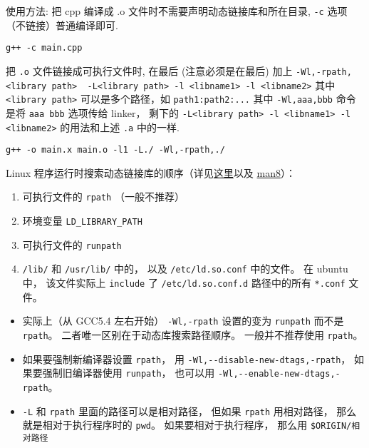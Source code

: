 使用方法:
把 cpp 编译成 .o 文件时不需要声明动态链接库和所在目录, \verb`-c` 选项（不链接）普通编译即可.
\begin{lstlisting}[language=none]
g++ -c main.cpp
\end{lstlisting}
把 \verb|.o| 文件链接成可执行文件时, 在最后 (注意必须是在最后) 加上
\verb`-Wl,-rpath,<library path>  -L<library path> -l <libname1> -l <libname2>` 其中 \verb|<library path>| 可以是多个路径，如 \verb|path1:path2:...|
其中 \verb`-Wl,aaa,bbb` 命令是将 \verb`aaa bbb` 选项传给 linker， 剩下的 \verb`-L<library path> -l <libname1> -l <libname2>` 的用法和上述 \verb|.a| 中的一样.

\begin{lstlisting}[language=none]
g++ -o main.x main.o -l1 -L./ -Wl,-rpath,./
\end{lstlisting}

Linux 程序运行时搜索动态链接库的顺序（详见\href{https://unix.stackexchange.com/questions/22926/where-do-executables-look-for-shared-objects-at-runtime}{这里}以及 \href{https://man7.org/linux/man-pages/man8/ld.so.8.html}{man8}）：
\begin{enumerate}
\item 可执行文件的 \verb|rpath| （一般不推荐）
\item 环境变量 \verb|LD_LIBRARY_PATH|
\item 可执行文件的 \verb|runpath|
\item \verb|/lib/| 和 \verb|/usr/lib/| 中的， 以及 \verb|/etc/ld.so.conf| 中的文件。 在 ubuntu 中， 该文件实际上 \verb|include| 了 \verb|/etc/ld.so.conf.d| 路径中的所有 \verb|*.conf| 文件。
\end{enumerate}

\begin{itemize}
\item 实际上（从 GCC5.4 左右开始） \verb|-Wl,-rpath| 设置的变为 \verb|runpath| 而不是 \verb|rpath|。 二者唯一区别在于动态库搜索路径顺序。 一般并不推荐使用 \verb|rpath|。
\item 如果要强制新编译器设置 \verb|rpath|， 用 \verb|-Wl,--disable-new-dtags,-rpath|， 如果要强制旧编译器使用 \verb|runpath|， 也可以用 \verb|-Wl,--enable-new-dtags,-rpath|。
\item \verb|-L| 和 \verb|rpath| 里面的路径可以是相对路径， 但如果 \verb|rpath| 用相对路径， 那么就是相对于执行程序时的 \verb|pwd|。 如果要相对于执行程序， 那么用 \verb|$ORIGIN/相对路径|
\end{itemize}

